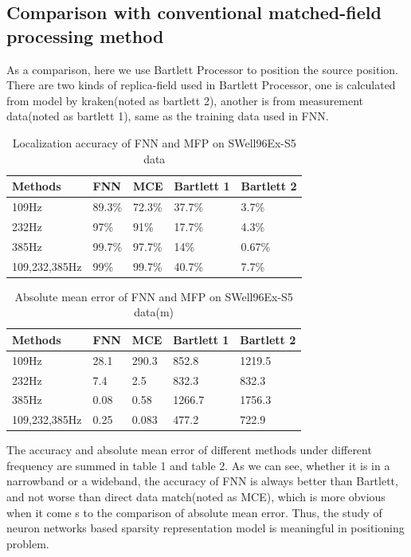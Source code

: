 \subsection{Comparison with conventional matched-field processing method}
As a comparison, here we use Bartlett Processor to position the source position. There are two kinds of replica-field used in Bartlett Processor, one is calculated from model by kraken(noted as bartlett 2), another is from measurement data(noted as bartlett 1), same as the training data used in FNN.
\begin{table}[]
\caption{Localization accuracy of FNN and MFP on SWell96Ex-S5 data}
\label{my-label}
\begin{tabular}{@{}lllll@{}}
\toprule
Methods       & FNN    & MCE    & Bartlett 1 & Bartlett 2 \\ \midrule
109Hz         & 89.3\% & 72.3\% & 37.7\%     & 3.7\%      \\
232Hz         & 97\%   & 91\%   & 17.7\%     & 4.3\%      \\
385Hz         & 99.7\% & 97.7\% & 14\%       & 0.67\%     \\
109,232,385Hz & 99\%   & 99.7\% & 40.7\%     & 7.7\%      \\ \bottomrule
\end{tabular}
\end{table}

\begin{table}[]
\caption{Absolute mean error of FNN and MFP on SWell96Ex-S5 data(m)}
\label{my-label}
\begin{tabular}{@{}lllll@{}}
\toprule
Methods       & FNN  & MCE   & Bartlett 1 & Bartlett 2 \\ \midrule
109Hz         & 28.1 & 290.3 & 852.8      & 1219.5     \\
232Hz         & 7.4  & 2.5   & 832.3      & 832.3      \\
385Hz         & 0.08 & 0.58  & 1266.7     & 1756.3     \\
109,232,385Hz & 0.25 & 0.083 & 477.2      & 722.9      \\ \bottomrule
\end{tabular}
\end{table}

The accuracy and absolute mean error of different methods under different frequency are summed in table 1 and table 2. As we can see, whether it is in a narrowband or a wideband, the accuracy of FNN is always better than Bartlett, and not worse than direct data match(noted as MCE), which is more obvious when it come s to the comparison of absolute mean error. Thus, the study of neuron networks based sparsity representation model is meaningful in positioning problem.

